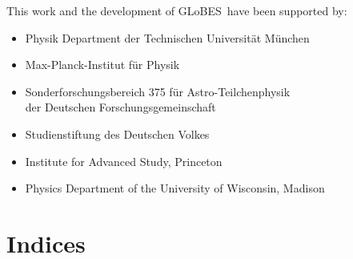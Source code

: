 \documentclass[a4paper,12pt,twoside]{book}
\newcommand{\GLOBES}{{\sf GLoBES}}
\begin{document}
This work and the development of \GLOBES\ have been supported by:
\begin{itemize}
\item Physik Department der Technischen Universit\"at M\"unchen
\item Max-Planck-Institut f\"ur Physik
\item Sonderforschungsbereich 375 f\"ur Astro-Teilchenphysik\\
der Deutschen Forschungsgemeinschaft
\item Studienstiftung des Deutschen Volkes
\item Institute for Advanced Study, Princeton
\item Physics Department of the University of Wisconsin, Madison
\end{itemize}









\chapter{Indices}



\end{document}
